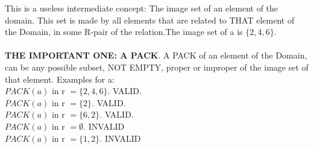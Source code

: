 	\noindent
	This is a useless intermediate concept: The image set of an element of the domain. This set is made by all elements that are related to THAT element of the Domain, in some R-pair of the relation.The image set of a is $\{2,4,6\}$.
	\\\\
	
	\noindent
	\textbf{THE IMPORTANT ONE: A PACK}. A PACK of an element of the Domain, can be any possible subset, NOT EMPTY, proper or improper of the image set of that element. Examples for a:\\
	$ PACK(a)$ in r $= \{2,4,6\}$. VALID. \\
	$ PACK(a)$ in r $= \{2\}$. VALID.     \\
	$ PACK(a)$ in r $= \{6,2\}$. VALID.   \\
	$ PACK(a)$ in r $= \emptyset$. INVALID \\
	$ PACK(a)$ in r $= \{1,2\}$. INVALID
	\\\\
 	

\newpage
	
	
	